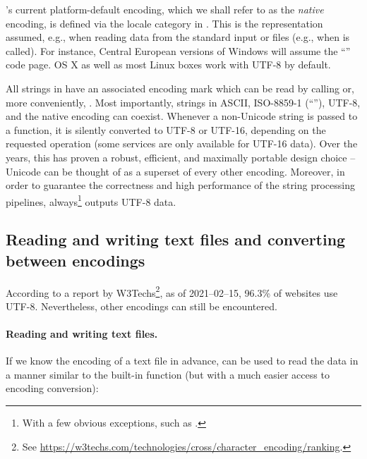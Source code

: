 \documentclass[nojss]{jss}\usepackage[]{graphicx}\usepackage[]{color}
\begin{document}
's current platform-default encoding, which we shall
refer to as the \textit{native} encoding, is defined via the
 locale category in
. This is the representation assumed,
e.g., when reading data from the standard input
or files (e.g., when 
is called).
For instance, Central European versions of Windows will assume
the ``'' code page.
OS X as well as most Linux boxes work with UTF-8 by default.

All strings in  have an associated encoding mark
which can be read by calling  or, more conveniently,
.
Most importantly, strings in ASCII, ISO-8859-1 (``''),
UTF-8, and the native encoding can coexist.
Whenever a non-Unicode string is passed to a  function,
it is silently converted to UTF-8 or UTF-16, depending on the requested
operation (some  services are only available for {UTF-16} data).
Over the years, this has proven a robust, efficient, and maximally portable
design choice -- Unicode can be thought of as a superset of every other encoding.
Moreover, in order to guarantee the correctness and high performance of
the string processing pipelines,  always\footnote{With a few
obvious exceptions, such as .} outputs
UTF-8 data.


\subsection{Reading and writing text files and converting between encodings}\label{Sec:read_lines}

According to a report by W3Techs\footnote{See
\url{https://w3techs.com/technologies/cross/character_encoding/ranking}.},
as of 2021--02--15, 96.3\% of websites use UTF-8.
Nevertheless, other encodings can still be encountered.

\paragraph{Reading and writing text files.}
If we know the encoding of a text file  in advance,
 can be used to read
the data in a manner similar to the built-in  function
(but with a much easier access to encoding conversion):
\end{document}
